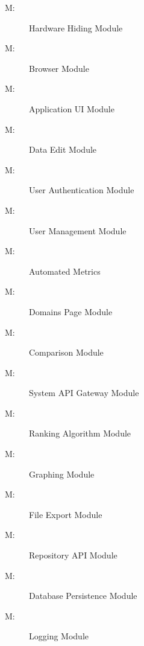 \documentclass[12pt, titlepage]{article}
\newcounter{mnum}
\newcommand{\mthemnum}{M\themnum}
\begin{document}
\begin{description}
\item [ \mthemnum \label{mHH1}:] Hardware Hiding Module
\item [ \mthemnum \label{mHH2}:] Browser Module
\item [ \mthemnum \label{mAppUI}:] Application UI Module
\item [ \mthemnum \label{mDataEdit}:] Data Edit Module
\item [ \mthemnum \label{mUserAuth}:] User Authentication Module
\item [ \mthemnum \label{mUserMgm}:] User Management Module
\item [ \mthemnum \label{mAutoMetrics}:] Automated Metrics
\item [ \mthemnum \label{mDomainsPage}:] Domains Page Module
\item [ \mthemnum \label{mCompare}:] Comparison Module
\item [ \mthemnum \label{mSysApi}:] System API Gateway Module
\item [ \mthemnum \label{mRankAlgo}:] Ranking Algorithm Module
\item [ \mthemnum \label{mGraphing}:] Graphing Module
\item [ \mthemnum \label{mExport}:] File Export Module
\item [ \mthemnum \label{mRepoAPI}:] Repository API Module
\item [ \mthemnum \label{mDB}:] Database Persistence Module
\item [ \mthemnum \label{mLog}:] Logging Module


\end{description}
\end{document}
